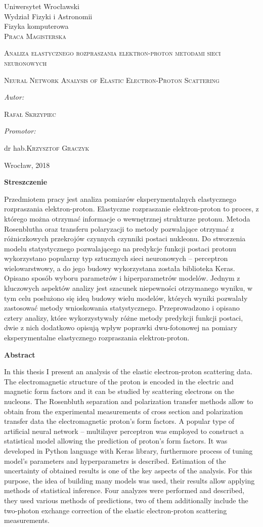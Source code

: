 \documentclass[11pt]{book}
\title{}
\author{Rafał Skrzypiec}
\makeatletter
\theoremstyle{definition}
\newcommand\blankpage{%
	\null
	\thispagestyle{empty}%
	\addtocounter{page}{0}%
	\newpage}
\renewcommand{\maketitle}{\begin{titlepage}
		
		
		
		\begin{center}
			{\Large Uniwersytet Wrocławski\\
				\vspace{0.cm}
				Wydział Fizyki i Astronomii\\
				\vspace{0.2cm}
				Fizyka komputerowa} \\
			\vspace{1.8cm}
			\LARGE \textsc{ Praca Magisterska}		
		\end{center}
		
		\vspace{3.5cm}
		
		\noindent
		
		\begin{center}		
			\huge \textsc{\@ Analiza elastycznego rozpraszania elektron-proton metodami sieci neuronowych}
			
			\vspace{0.5cm}
			
			\normalsize \textsc {Neural Network Analysis of Elastic Electron-Proton  Scattering}
			
		\end{center}
		
		
		
		\vspace{3cm}
		
		\begin{flushright}
			
			\begin{minipage}{5.5cm}
				
				\textit{\small Autor:}
				
				\normalsize \textsc{\@ Rafał Skrzypiec} \par
				
			\end{minipage}
			
			\vspace{1cm}
			
			
			\begin{minipage}{5.5cm}
				
				\textit{\small Promotor:}
				
				\hspace{0.2cm}dr hab.\textsc{\@ Krzysztof Graczyk} \par
				
			\end{minipage}
			
		\end{flushright}
		
		
		\vspace*{\stretch{4}}
		
		\begin{center}
			
			Wrocław, 2018
			
		\end{center}
		
	\end{titlepage}%
	
}
\makeatother
\begin{document}

\maketitle
\blankpage


\begin{center}
	{\large 	\textbf{Streszczenie}}

\end{center}
\normalsize
	Przedmiotem pracy jest analiza pomiarów eksperymentalnych elastycznego rozpraszania elektron-proton. Elastyczne rozpraszanie elektron-proton to proces, z którego można otrzymać informacje o wewnętrznej strukturze protonu. Metoda Rosenblutha oraz transferu polaryzacji to metody pozwalające otrzymać z różniczkowych przekrojów czynnych czynniki postaci nukleonu. Do stworzenia modelu statystycznego pozwalającego na predykcje funkcji postaci protonu wykorzystano popularny typ sztucznych sieci neuronowych -- perceptron wielowarstwowy, a do jego budowy wykorzystana została biblioteka Keras. Opisano sposób wyboru parametrów i hiperparametrów modelów. Jednym z kluczowych aspektów analizy jest szacunek niepewności otrzymanego wyniku, w tym celu posłużono się ideą budowy wielu modelów, których wyniki pozwalały zastosować metody wnioskowania statystycznego. Przeprowadzono i opisano cztery analizy, które wykorzystywały różne metody predykcji funkcji postaci, dwie z nich dodatkowo opisują wpływ poprawki dwu-fotonowej na pomiary eksperymentalne elastycznego rozpraszania elektron-proton.

\vspace{2cm}

\begin{center}
	{\large 	\textbf{Abstract}}
\end{center}
\normalsize
In this thesis I present an analysis of the elastic electron-proton scattering data. The electromagnetic structure of the proton is encoded in the electric and magnetic form factors and it can be studied by scattering electrons on the nucleons. The Rosenbluth separation and polarization transfer methods allow to obtain from the experimental measurements of cross section and polarization transfer data the electromagnetic proton's form factors. A popular type of artificial neural network -- multilayer perceptron was employed to construct a statistical model allowing the prediction of proton's form factors. It was developed in Python language with Keras library, furthermore process of tuning model's parameters and hyperparametrs is described. Estimation of the uncertainty of obtained results is one of the key aspects of the analysis. For this purpose, the idea of building many models was used, their results allow applying methods of statistical inference. Four analyzes were performed and described, they used various methods of predictions, two of them additionally include the two-photon exchange correction of the elastic electron-proton scattering measurements.
\vspace{2cm}
\end{document}
